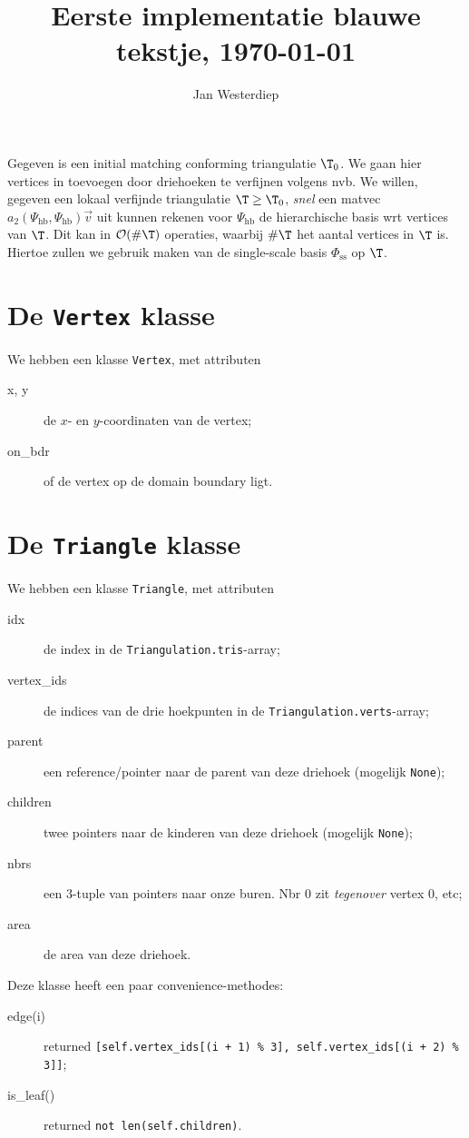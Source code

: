 \documentclass[11pt,a4paper]{amsart}
\theoremstyle{definition}
\begin{document}
\title{Eerste implementatie blauwe tekstje, \today}
\author{Jan Westerdiep}
\maketitle

Gegeven is een initial matching conforming triangulatie $\T_0$. We gaan hier
vertices in toevoegen door driehoeken te verfijnen volgens nvb. We willen, gegeven
een lokaal verfijnde triangulatie $\T \geq \T_0$, \emph{snel} een matvec
$a_2(\Psi_{\text{hb}}, \Psi_{\text{hb}}) \vec v$ uit kunnen rekenen voor
$\Psi_{\text{hb}}$ de hierarchische basis wrt vertices van $\T$. Dit kan in
$\mathcal O(\# \T)$ operaties, waarbij $\# \T$ het aantal vertices in $\T$ is.
Hiertoe zullen we gebruik maken van de single-scale basis $\Phi_{\text{ss}}$ op
$\T$.

\section*{De \texttt{Vertex} klasse}
We hebben een klasse \texttt{Vertex}, met attributen
\begin{description}
  \item[x, y] de $x$- en $y$-coordinaten van de vertex;
  \item[on\_bdr] of de vertex op de domain boundary ligt.
\end{description}

\section*{De \texttt{Triangle} klasse}
We hebben een klasse \texttt{Triangle}, met attributen
\begin{description}
  \item[idx] de index in de \texttt{Triangulation.tris}-array;
  \item[vertex\_ids] de indices van de drie hoekpunten in de \texttt{Triangulation.verts}-array;
  \item[parent] een reference/pointer naar de parent van deze driehoek (mogelijk \texttt{None});
  \item[children] twee pointers naar de kinderen van deze driehoek (mogelijk \texttt{None});
  \item[nbrs] een 3-tuple van pointers naar onze buren. Nbr $0$ zit \emph{tegenover} vertex 0, etc;
  \item[area] de area van deze driehoek.
\end{description}
Deze klasse heeft een paar convenience-methodes:
\begin{description}
  \item[edge(i)] returned \texttt{[self.vertex\_ids[(i + 1) \% 3], self.vertex\_ids[(i + 2) \% 3]]};
  \item[is\_leaf()] returned \texttt{not len(self.children)}.
\end{description}
\end{document}
